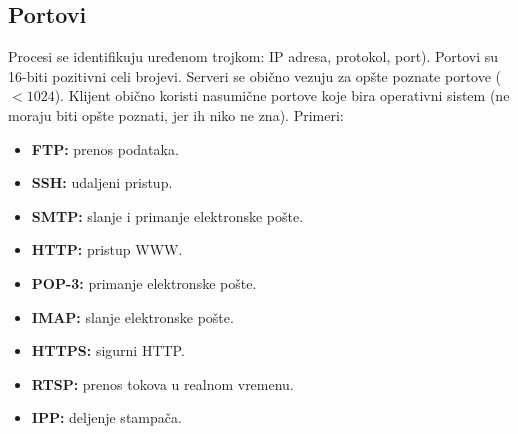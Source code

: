 \documentclass[a4paper]{article}
\begin{document}
    \subsection{Portovi}
        Procesi se identifikuju uređenom trojkom: IP adresa, protokol, port). Portovi su 16-biti
        pozitivni celi brojevi. Serveri se obično vezuju za opšte poznate portove ($<1024$).
        Klijent obično koristi nasumične portove koje bira operativni sistem (ne moraju biti
        opšte poznati, jer ih niko ne zna). Primeri:
        \begin{itemize}
            \item \textbf{FTP:} prenos podataka.
            \item \textbf{SSH:} udaljeni pristup.
            \item \textbf{SMTP:} slanje i primanje elektronske pošte.
            \item \textbf{HTTP:} pristup WWW.
            \item \textbf{POP-3:} primanje elektronske pošte.
            \item \textbf{IMAP:} slanje elektronske pošte.
            \item \textbf{HTTPS:} sigurni HTTP.
            \item \textbf{RTSP:} prenos tokova u realnom vremenu.
            \item \textbf{IPP:} deljenje stampača.
        \end{itemize}
\end{document}
